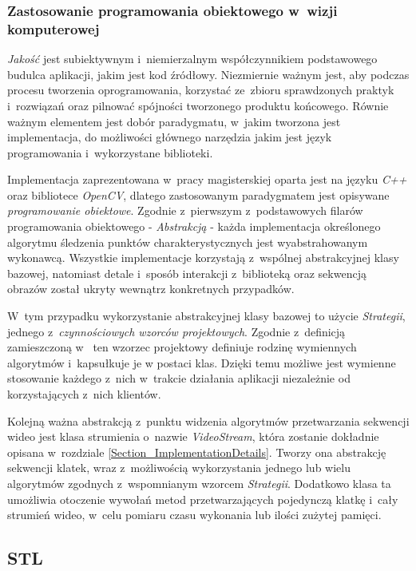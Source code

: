       \subsubsection{Zastosowanie programowania obiektowego w~wizji komputerowej}
      \textit{Jakość} jest subiektywnym i~niemierzalnym współczynnikiem podstawowego budulca aplikacji, jakim jest kod źródłowy. Niezmiernie ważnym jest, aby podczas procesu tworzenia oprogramowania, korzystać ze~zbioru sprawdzonych praktyk i~rozwiązań oraz pilnować spójności tworzonego produktu końcowego. Równie ważnym elementem jest dobór paradygmatu, w~jakim tworzona jest implementacja, do możliwości głównego narzędzia jakim jest język programowania i~wykorzystane biblioteki.

      Implementacja zaprezentowana w~pracy magisterskiej oparta jest na języku \textit{C++} oraz bibliotece \textit{OpenCV}, dlatego zastosowanym paradygmatem jest opisywane \textit{programowanie obiektowe}. Zgodnie z~pierwszym z~podstawowych filarów programowania obiektowego - \textit{Abstrakcją} - każda implementacja określonego algorytmu śledzenia punktów charakterystycznych jest wyabstrahowanym wykonawcą. Wszystkie implementacje korzystają z~wspólnej abstrakcyjnej klasy bazowej, natomiast detale i~sposób interakcji z~biblioteką oraz sekwencją obrazów został ukryty wewnątrz konkretnych przypadków.

      W~tym przypadku wykorzystanie abstrakcyjnej klasy bazowej to użycie \textit{Strategii}, jednego z~\textit{czynnościowych wzorców projektowych}. Zgodnie z~definicją zamieszczoną w~\cite{PatternsGoF} ten wzorzec projektowy definiuje rodzinę wymiennych algorytmów i~kapsułkuje je w postaci klas. Dzięki temu możliwe jest wymienne stosowanie każdego z~nich w~trakcie działania aplikacji niezależnie od korzystających z~nich klientów.

      Kolejną ważna abstrakcją z~punktu widzenia algorytmów przetwarzania sekwencji wideo jest klasa strumienia o~nazwie \textit{VideoStream}, która zostanie dokładnie opisana w~rozdziale \ref{Section_ImplementationDetails}. Tworzy ona abstrakcję sekwencji klatek, wraz z~możliwością wykorzystania jednego lub wielu algorytmów zgodnych z~wspomnianym wzorcem \textit{Strategii}. Dodatkowo klasa ta umożliwia otoczenie wywołań metod przetwarzających pojedynczą klatkę i~cały strumień wideo, w~celu pomiaru czasu wykonania lub ilości zużytej pamięci.

    \subsection{STL}\label{Subsection_STL}

